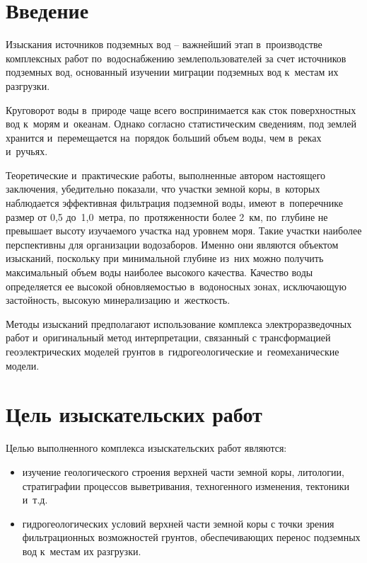 \bigskip


\newpage

\section{Введение}

Изыскания источников подземных вод -- важнейший этап в~производстве комплексных работ по~водоснабжению землепользователей за счет источников подземных вод, основанный изучении миграции подземных вод к~местам их разгрузки.

Круговорот воды в~природе чаще всего воспринимается как сток поверхностных вод к~морям и~океанам. Однако согласно статистическим сведениям, под землей хранится и~перемещается на~порядок больший объем воды, чем в~реках и~ручьях.

Теоретические и~практические работы, выполненные автором настоящего заключения, убедительно показали, что участки земной коры, в~которых наблюдается эффективная фильтрация подземной воды, имеют в~поперечнике размер от 0,5 до~1,0~метра, по~протяженности более 2~км, по~глубине не превышает высоту изучаемого участка над уровнем моря. Такие участки наиболее перспективны для организации водозаборов. Именно они являются объектом изысканий, поскольку при минимальной глубине из~них можно получить максимальный объем воды наиболее высокого качества. Качество воды определяется ее высокой обновляемостью в~водоносных зонах, исключающую застойность, высокую минерализацию и~жесткость.

Методы изысканий предполагают использование комплекса электроразведочных работ и~оригинальный метод интерпретации, связанный с трансформацией геоэлектрических моделей грунтов в~гидрогеологические и~геомеханические модели.

\section{Цель изыскательских работ}
Целью выполненного комплекса изыскательских работ являются:
\begin{itemize}
	\item изучение геологического строения верхней части земной коры, литологии, стратиграфии процессов выветривания, техногенного изменения, тектоники и~т.д.
	\item гидрогеологических условий верхней части земной коры с точки зрения фильтрационных возможностей грунтов, обеспечивающих перенос подземных вод к~местам их разгрузки.
\end{itemize}


